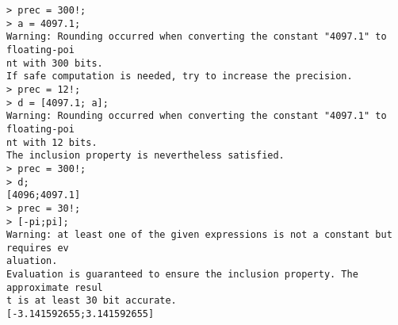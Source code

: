 \begin{center}\begin{minipage}{15cm}\begin{Verbatim}[frame=single]
> prec = 300!;
> a = 4097.1;
Warning: Rounding occurred when converting the constant "4097.1" to floating-poi
nt with 300 bits.
If safe computation is needed, try to increase the precision.
> prec = 12!;
> d = [4097.1; a];
Warning: Rounding occurred when converting the constant "4097.1" to floating-poi
nt with 12 bits.
The inclusion property is nevertheless satisfied.
> prec = 300!;
> d;
[4096;4097.1]
> prec = 30!;
> [-pi;pi];
Warning: at least one of the given expressions is not a constant but requires ev
aluation.
Evaluation is guaranteed to ensure the inclusion property. The approximate resul
t is at least 30 bit accurate.
[-3.141592655;3.141592655]
\end{Verbatim}
\end{minipage}\end{center}
